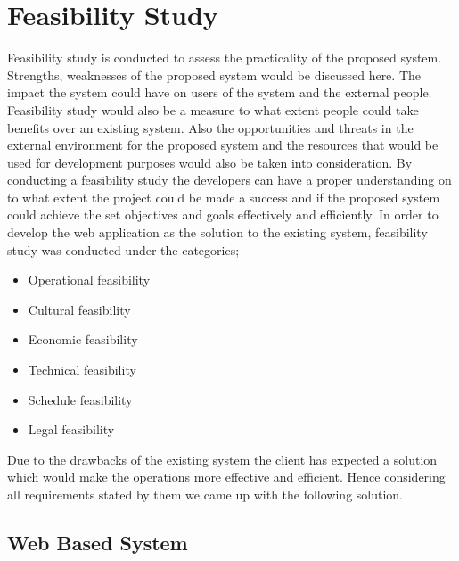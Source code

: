 \documentclass[a4paper,beamer]{article}
\begin{document}
	\section{Feasibility Study}
	Feasibility study is conducted to assess the practicality of the proposed system. Strengths, weaknesses of the proposed system would be discussed here. The impact the system could have on users of the system and the external people. Feasibility study would also be a measure to what extent people could take benefits over an existing system. Also the opportunities and threats in the external environment for the proposed system and the resources that would be used for development purposes would also be taken into consideration.\newline
	By conducting a feasibility study the developers can have a proper understanding on to what extent the project could be made a success and if the proposed system could achieve the set objectives and goals effectively and efficiently.\newline	
	In order to develop the web application as the solution to the existing system, feasibility study was conducted under the categories;
	
	\begin{itemize}
		\item Operational feasibility
		\item Cultural feasibility
		\item Economic feasibility
		\item Technical feasibility
		\item Schedule feasibility
		\item Legal feasibility
	\end{itemize}
	
	Due to the drawbacks of the existing system the client has expected a solution which would make the operations more effective and efficient. Hence considering all requirements stated by them we came up with the following solution.
	
	\subsection{Web Based System}
\end{document}
